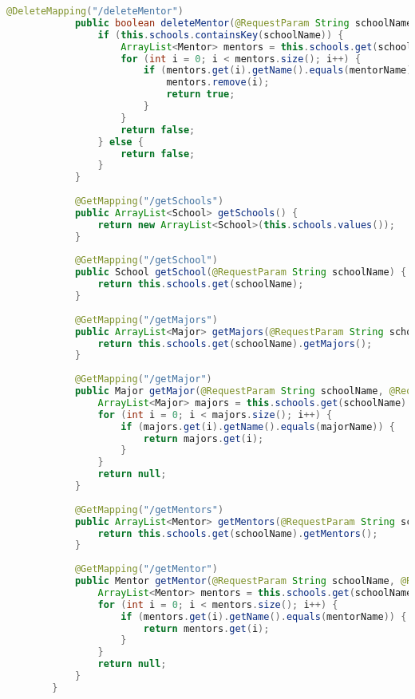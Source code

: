 \documentclass[UTF8]{ctexart}
\begin{document}
\begin{lstlisting}[language=java]
            @DeleteMapping("/deleteMentor")
            public boolean deleteMentor(@RequestParam String schoolName, @RequestParam String mentorName) {
                if (this.schools.containsKey(schoolName)) {
                    ArrayList<Mentor> mentors = this.schools.get(schoolName).getMentors();
                    for (int i = 0; i < mentors.size(); i++) {
                        if (mentors.get(i).getName().equals(mentorName)) {
                            mentors.remove(i);
                            return true;
                        }
                    }
                    return false;
                } else {
                    return false;
                }
            }
    
            @GetMapping("/getSchools")
            public ArrayList<School> getSchools() {
                return new ArrayList<School>(this.schools.values());
            }
        
            @GetMapping("/getSchool")
            public School getSchool(@RequestParam String schoolName) {
                return this.schools.get(schoolName);
            }
        
            @GetMapping("/getMajors")
            public ArrayList<Major> getMajors(@RequestParam String schoolName) {
                return this.schools.get(schoolName).getMajors();
            }
        
            @GetMapping("/getMajor")
            public Major getMajor(@RequestParam String schoolName, @RequestParam String majorName) {
                ArrayList<Major> majors = this.schools.get(schoolName).getMajors();
                for (int i = 0; i < majors.size(); i++) {
                    if (majors.get(i).getName().equals(majorName)) {
                        return majors.get(i);
                    }
                }
                return null;
            }
        
            @GetMapping("/getMentors")
            public ArrayList<Mentor> getMentors(@RequestParam String schoolName) {
                return this.schools.get(schoolName).getMentors();
            }
        
            @GetMapping("/getMentor")
            public Mentor getMentor(@RequestParam String schoolName, @RequestParam String mentorName) {
                ArrayList<Mentor> mentors = this.schools.get(schoolName).getMentors();
                for (int i = 0; i < mentors.size(); i++) {
                    if (mentors.get(i).getName().equals(mentorName)) {
                        return mentors.get(i);
                    }
                }
                return null;
            }
        }       
    \end{lstlisting}
    
\end{document}
